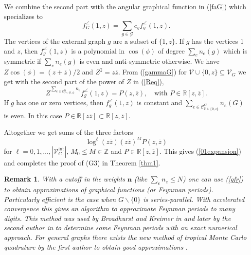 \documentclass[oneside]{amsart}
\newcommand{\RR}{{\mathbb R}}
\newcommand{\ZZ}{{\mathbb Z}}
\newcommand{\zz}{{\overline{z}}}
\newcommand{\sC}{\mathcal{C}}
\newcommand{\sG}{\mathcal{G}}
\newcommand{\sV}{\mathcal{V}}
\newcommand{\sVGint}{{\sV_G^\mathrm{int}}}
\newcommand{\VGint}{{|\sVGint|}}
\theoremstyle{plain}
\newtheorem{remark}[thm]{Remark}
\begin{document}
We combine the second part with the angular graphical function in (\ref{faG}) which specializes to
$$
f^\angle_G(1,z)=\sum_{g\in\sG}c_gf^\angle_g(1,z).
$$
The vertices of the external graph $g$ are a subset of $\{1,z\}$.
If $g$ has the vertices 1 and $z$, then $f_g^\angle(1,z)$ is a polynomial in $\cos(\phi)$ of degree $\sum_en_e(g)$ which is symmetric if $\sum_en_e(g)$ is even and anti-symmetric otherwise.
We have $Z\cos(\phi)=(z+\zz)/2$ and $Z^2=z\zz$. From (\ref{gammaG}) for $\sV\cup\{0,z\}\subseteq\sV_G$ we get with the second part of the power of $Z$ in (\ref{Req}),
$$
Z^{\sum_{e\in\sC^G_{\sV\cup\{0,z\}}}n_e}f^\angle_g(1,z)=P(z,\zz),\quad\text{with }P\in\RR[z,\zz].
$$
If $g$ has one or zero vertices, then $f_g^\angle(1,z)$ is constant and $\sum_{e\in\sC^G_{\sV\cup\{0,z\}}}n_e(G)$ is even.
In this case $P\in\RR[z\zz]\subset\RR[z,\zz]$.

Altogether we get sums of the three factors
$$
\log^\ell (z\zz) (z\zz)^MP(z,\zz)
$$
for $\ell=0,1,\ldots,\VGint$, $M_0\leq M\in\ZZ$ and $P\in\RR[z,\zz]$. This gives (\ref{01expansion}) and completes the proof of (G3) in Theorem \ref{thm1}.

\begin{remark}
With a cutoff in the weights ${\mathbf n}$ (like $\sum_en_e\leq N$) one can use (\ref{gfr}) to obtain approximations of graphical functions (or Feynman periods).
Particularly efficient is the case when $G\backslash\{0\}$ is series-parallel.
With accelerated convergence this gives an algorithm to approximate Feynman periods to many digits. This method was used by Broadhurst and Kreimer in \cite{BK}
and later by the second author in \cite{Census} to determine some Feynman periods with an exact numerical approach.
For general graphs there exists the new method of tropical Monte Carlo quadrature by the first author to obtain good approximations \cite{TMCQ}.
\end{remark}

\end{document}
